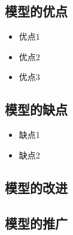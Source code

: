 \documentclass[withoutpreface,bwprint]{cumcmthesis}
\begin{document}
\subsection{模型的优点}
\begin{itemize}[itemindent=2em]
\item 优点1
\item 优点2
\item 优点3
\end{itemize}

\subsection{模型的缺点}
\begin{itemize}[itemindent=2em]
\item 缺点1
\item 缺点2
\end{itemize}




\subsection{模型的改进}






\subsection{模型的推广}






































\newpage
\nocite{*}
\end{document}
